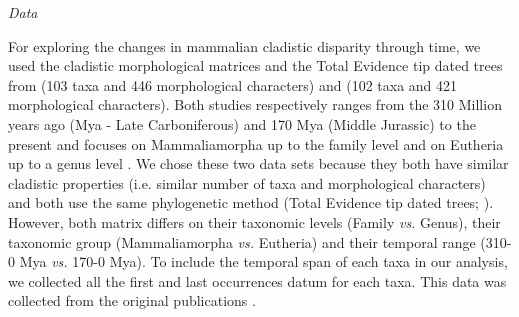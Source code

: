 \documentclass[12pt,letterpaper]{article}
\renewcommand{\subsection}[1]{%
\bigskip
\begin{center}
\begin{large}
\normalfont\itshape #1
\end{large}
\end{center}}
\begin{document}
\subsection{Data}
For exploring the changes in mammalian cladistic disparity through time, we used the cladistic morphological matrices and the Total Evidence tip dated trees \citep{ronquista2012} from \cite{MEE3:MEE312084} (103 taxa and 446 morphological characters) and \cite{beckancient2014} (102 taxa and 421 morphological characters). Both studies respectively ranges from the 310 Million years ago (Mya - Late Carboniferous) and 170 Mya (Middle Jurassic) to the present and focuses on Mammaliamorpha up to the family level \cite{MEE3:MEE312084} and on Eutheria up to a genus level \cite{beckancient2014}. We chose these two data sets because they both have similar cladistic properties (i.e. similar number of taxa and morphological characters) and both use the same phylogenetic method (Total Evidence tip dated trees; \citealt{ronquista2012}). However, both matrix differs on their taxonomic levels (Family \textit{vs.} Genus), their taxonomic group (Mammaliamorpha \textit{vs.} Eutheria) and their temporal range (310-0 Mya \textit{vs.} 170-0 Mya). To include the temporal span of each taxa in our analysis, we collected all the first and last occurrences datum for each taxa. This data was collected from the original publications \citep{MEE3:MEE312084,beckancient2014}.
\end{document}

